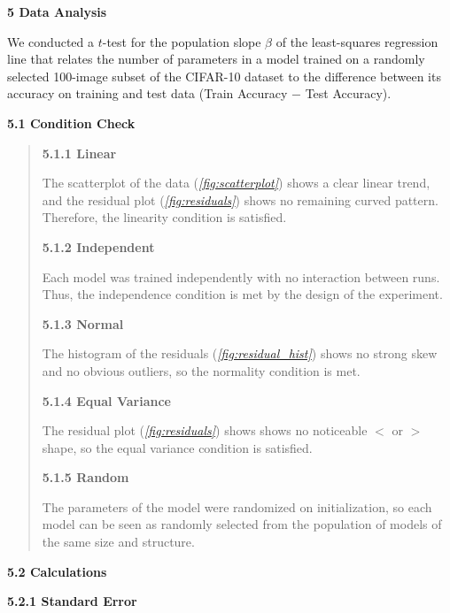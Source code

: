 \documentclass[12pt]{article}
\begin{document}
    \noindent\textbf{5 Data Analysis}

    We conducted a $t$-test for the population slope $\beta$ of the least-squares regression line that relates the number of parameters in a model trained on a randomly selected 100-image subset of the CIFAR-10 dataset to the difference between its accuracy on training and test data (Train Accuracy $-$ Test Accuracy).

    \noindent\textbf{5.1 Condition Check}

    \begin{quote}

    \textbf{5.1.1 Linear}

    The scatterplot of the data (\textit{\autoref{fig:scatterplot}}) shows a clear linear trend, and the residual plot (\textit{\autoref{fig:residuals}}) shows no remaining curved pattern.
    Therefore, the linearity condition is satisfied.

    \textbf{5.1.2 Independent}

    Each model was trained independently with no interaction between runs. Thus, the independence condition is met by the design of the experiment.

    \textbf{5.1.3 Normal}

    The histogram of the residuals (\textit{\autoref{fig:residual_hist}}) shows no strong skew and no obvious outliers,
    so the normality condition is met.

    \textbf{5.1.4 Equal Variance}

    The residual plot (\textit{\autoref{fig:residuals}}) shows shows no noticeable $<$ or $>$ shape, so the equal variance condition is satisfied.

    \textbf{5.1.5 Random}

    The parameters of the model were randomized on initialization, so each model can be seen as randomly selected from the population
    of models of the same size and structure.

    \end{quote}

    \noindent\textbf{5.2 Calculations}

    \noindent\textbf{5.2.1 Standard Error}
\end{document}

